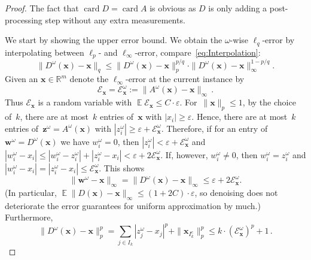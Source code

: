 \documentclass[12pt]{article}
\theoremstyle{plain}
\theoremstyle{definition}
\newcommand{\expect}{\operatorname{\mathbb{E}}}
\DeclareMathOperator{\card}{card}
\newcommand{\eps}{\varepsilon}
\renewcommand{\vec}{\boldsymbol}
\newcommand{\R}{{\mathbb R}}
\begin{document}
\begin{proof}
    The fact that 
        $\card D = \card A$ 
    is obvious as 
    $D$ is only adding a post-processing step without any extra measurements.
    
    We start by showing the upper error bound.
    We obtain the $\omega$-wise $\ell_q$-error by interpolating between $\ell_p$- and $\ell_\infty$-error, compare~\eqref{eq:Interpolation}:
    \begin{equation} \label{eq:Interpolation2}
       \| D^\omega(\vec{x}) - \vec{x}\|_q
       \leq \| D^\omega(\vec{x}) - \vec{x} \|_p^{p/q} 
                \cdot \|  D^\omega(\vec{x}) - \vec{x} \|_{\infty}^{1 - p/q} .
    \end{equation}
    Given an $\vec{x} \in \R^m$
    denote the $\ell_\infty$-error at the current instance by
    \begin{equation*}
        \mathcal{E}_{\vec{x}}
            = \mathcal{E}^{\omega}_{\vec{x}}
            := \| A^\omega(\vec{x}) - \vec{x}\|_{\infty}\,.
    \end{equation*}
    Thus $\mathcal{E}_{\vec{x}}$ is a random variable
    with $\expect \mathcal{E}_{\vec{x}} \leq C \cdot \eps$.
    For~$\|\vec{x}\|_p \leq 1$, by the choice of~$k$, there are at most~$k$ entries of~$\vec{x}$ with $|x_i| \geq \eps$.
    Hence, there are at most~$k$ entries of~$\vec{z}^\omega = A^\omega(\vec{x})$ with $|z_i^\omega| \geq \eps+\mathcal{E}_{\vec{x}}^\omega$.
    Therefore, if for an entry of $\vec{w}^\omega = D^\omega(\vec{x})$ we have $w_i^\omega = 0$, then $|z_i^\omega| < \eps+\mathcal{E}_{\vec{x}}^\omega$ and
    $|w_i^\omega - x_i| \leq |w_i^\omega - z_i^\omega| + |z_i^\omega - x_i| < \eps + 2\mathcal{E}_{\vec{x}}^\omega$.
    If, however, $w_i^\omega \neq 0$, then $w_i^\omega = z_i^\omega$ and $|w_i^\omega - x_i| = |z_i^\omega - x_i| \leq \mathcal{E}_{\vec{x}}^\omega$.
    This shows
    \begin{equation*}
        \|\vec{w}^\omega - \vec{x}\|_\infty
        = \|D^\omega(\vec{x}) - \vec{x}\|_\infty
        \leq \eps + 2\mathcal{E}_{\vec{x}}^\omega.
    \end{equation*}
    (In particular, $\expect\|D(\vec{x}) - \vec{x}\|_\infty \leq (1+2C) \cdot \eps$, so denoising does not deteriorate the error guarantees for uniform approximation by much.)
    Furthermore, 
    \begin{equation}\label{eq:2NormBound}
      \| D^{\omega}(\vec{x}) - \vec{x} \|_p^p 
      = \sum_{j \in I_k} |z_j^{\omega} - x_j|^p +
      \| \vec{x}_{I_k^c} \|_p^p 
      \leq  k \cdot (\mathcal{E}^{\omega}_{\vec{x}})^p + 1 \,.

\end{equation}
\end{proof}
\end{document}
